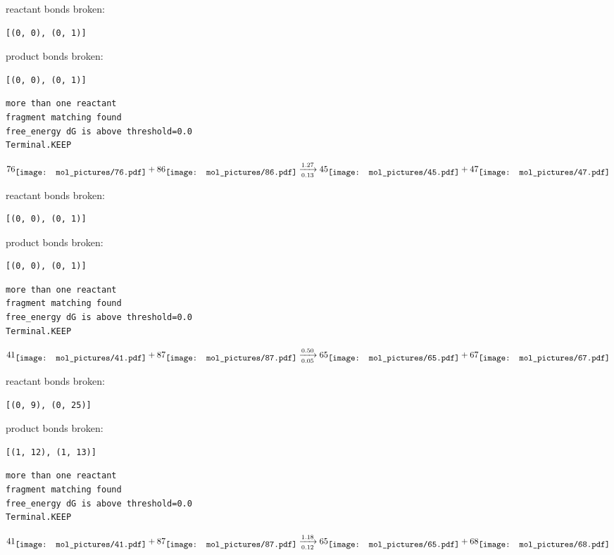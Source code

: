 \documentclass{article}
\begin{document}
reactant bonds broken:\begin{verbatim}
[(0, 0), (0, 1)]
\end{verbatim}
product bonds broken:\begin{verbatim}
[(0, 0), (0, 1)]
\end{verbatim}




\vspace{1cm}
\begin{verbatim}
more than one reactant
fragment matching found
free_energy dG is above threshold=0.0
Terminal.KEEP
\end{verbatim}
$$
76
\raisebox{-.5\height}{\texttt{[image: mol\_pictures/76.pdf]}}
+
86
\raisebox{-.5\height}{\texttt{[image: mol\_pictures/86.pdf]}}
\xrightarrow[0.13]{1.27}
45
\raisebox{-.5\height}{\texttt{[image: mol\_pictures/45.pdf]}}
+
47
\raisebox{-.5\height}{\texttt{[image: mol\_pictures/47.pdf]}}
$$


reactant bonds broken:\begin{verbatim}
[(0, 0), (0, 1)]
\end{verbatim}
product bonds broken:\begin{verbatim}
[(0, 0), (0, 1)]
\end{verbatim}




\vspace{1cm}
\begin{verbatim}
more than one reactant
fragment matching found
free_energy dG is above threshold=0.0
Terminal.KEEP
\end{verbatim}
$$
41
\raisebox{-.5\height}{\texttt{[image: mol\_pictures/41.pdf]}}
+
87
\raisebox{-.5\height}{\texttt{[image: mol\_pictures/87.pdf]}}
\xrightarrow[0.05]{0.50}
65
\raisebox{-.5\height}{\texttt{[image: mol\_pictures/65.pdf]}}
+
67
\raisebox{-.5\height}{\texttt{[image: mol\_pictures/67.pdf]}}
$$


reactant bonds broken:\begin{verbatim}
[(0, 9), (0, 25)]
\end{verbatim}
product bonds broken:\begin{verbatim}
[(1, 12), (1, 13)]
\end{verbatim}




\vspace{1cm}
\begin{verbatim}
more than one reactant
fragment matching found
free_energy dG is above threshold=0.0
Terminal.KEEP
\end{verbatim}
$$
41
\raisebox{-.5\height}{\texttt{[image: mol\_pictures/41.pdf]}}
+
87
\raisebox{-.5\height}{\texttt{[image: mol\_pictures/87.pdf]}}
\xrightarrow[0.12]{1.18}
65
\raisebox{-.5\height}{\texttt{[image: mol\_pictures/65.pdf]}}
+
68
\raisebox{-.5\height}{\texttt{[image: mol\_pictures/68.pdf]}}
$$
\end{document}
